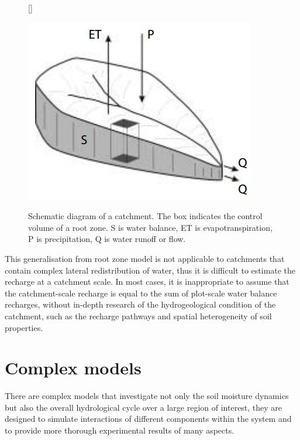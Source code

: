 \begin{figure}[bth]
[\FBwidth]
{\caption{Schematic diagram of a catchment\citep{Zhang2002}. The box indicates the control volume of a root zone. S is water balance, ET is evapotranspiration, P is precipitation, Q is water runoff or flow.}\label{fig:catchment}}
{\includegraphics[width=0.9\linewidth]{gfx/catchment}}
\end{figure}
\newline
This generalisation from root zone model is not applicable to catchments that contain complex lateral redistribution of water, thus it is difficult to estimate the recharge at a catchment scale. In most cases, it is inappropriate to assume that the catchment-scale recharge is equal to the sum of plot-scale water balance recharges, without in-depth research of the hydrogeological condition of the catchment, such as the recharge pathways and spatial heterogeneity of soil properties\citep{Zhang2002}.
 
\section{Complex models}
	There are complex models that investigate not only the soil moisture dynamics but also the overall hydrological cycle over a large region of interest, they are designed to simulate interactions of different components within the system and to provide more thorough experimental results of many aspects\citep{Zhang2001}.
